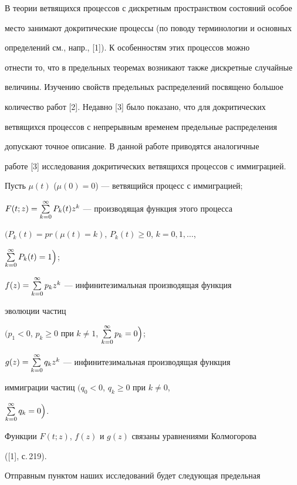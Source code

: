 В теории ветвящихся процессов с дискретным пространством состояний особое


место занимают докритические процессы (по поводу терминологии и основных


определений см., напр., [1]). К особенностям этих процессов можно


отнести то, что в предельных теоремах возникают также дискретные случайные


величины. Изучению свойств предельных распределений посвящено большое


количество работ [2]. Недавно [3] было показано, что для докритических


ветвящихся процессов с непрерывным временем предельные распределения


допускают точное описание. В данной работе приводятся аналогичные


работе [3] исследования докритических ветвящихся процессов с иммиграцией.





Пусть $\mu (t)$ ($\mu (0)=0$) --- ветвящийся процесс с иммиграцией;


$F(t;z)=\sum \limits_ {k=0}^{\infty }P_k(t)z^k$ --- производящая функция этого процесса


$\Big(P_k(t)=pr(\mu (t)=k)$, $P_k(t)\geq 0$, $k=0,1, \dotsc$,


$\sum \limits_ {k=0}^{\infty }P_k(t)=1\Big)$;


$f(z)=\sum \limits_ {k=0}^{\infty }p_kz^k$  --- инфинитезимальная производящая функция


эволюции частиц


$\Big(p_1<0$, $p_k\geq 0$ при $k\ne 1$, $\sum \limits_ {k=0}^{\infty }p_k=0\Big)$;


$g(z)=\sum \limits_ {k=0}^{\infty }q_kz^k $ --- инфинитезимальная производящая функция


иммиграции частиц $\Big(q_0<0$, $q_k\geq 0$ при $k\ne 0$,


$\sum \limits_ {k=0}^{\infty }q_k=0\Big)$.


Функции $F(t;z)$, $f(z)$ и $g(z)$ связаны уравнениями Колмогорова


([1], с.\,219).





Отправным пунктом наших исследований будет следующая предельная


\medskip





